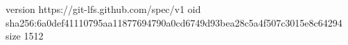 version https://git-lfs.github.com/spec/v1
oid sha256:6a0def41110795aa11877694790a0cd6749d93bea28c5a4f507c3015e8c64294
size 1512
